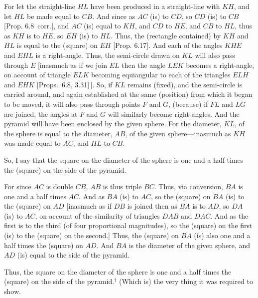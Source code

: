 \begin{Parallel}{}{}
{For let the straight-line $HL$ have been produced in a straight-line with $KH$, and let
$HL$ be made equal to $CB$. And since as $AC$ (is) to $CD$, 
so $CD$ (is) to $CB$ [Prop. 6.8~corr.], and $AC$ (is) equal to $KH$, and $CD$ to
$HE$, and $CB$ to $HL$, thus as $KH$ is to $HE$, so $EH$ (is) to $HL$.
Thus,  the (rectangle contained) by $KH$ and $HL$ is equal to the
(square) on $EH$ [Prop. 6.17]. And each of the angles $KHE$ and
$EHL$ is a right-angle. Thus, the semi-circle drawn on $KL$ 
will also pass through $E$ [inasmuch as if we join $EL$ then the angle
$LEK$ becomes a right-angle, on account of triangle $ELK$
becoming equiangular to each of the triangles $ELH$ and $EHK$ [Props.~6.8, 3.31]\,]. So, if
$KL$ remains (fixed), and the semi-circle is carried around, and again
established at the same (position) from which it began to be moved, 
it will also pass through points $F$ and $G$, (because) if  $FL$ and
$LG$ are joined, the angles at $F$ and $G$ will similarly become  right-angles. And the pyramid will have been enclosed by the given sphere.
For the diameter, $KL$,  of the sphere is equal to the diameter, $AB$,
of the given sphere---inasmuch as $KH$ was made equal to $AC$, 
and $HL$ to $CB$. 

So, I say that the square on the diameter of the sphere is
one and a half times the (square) on the side of the pyramid.

For since $AC$ is double $CB$, $AB$ is thus triple $BC$. Thus,
via conversion, $BA$ is one and a half times $AC$. And as
$BA$ (is) to $AC$, so the (square) on $BA$ (is) to the (square) on $AD$
[inasmuch as if $DB$ is joined then as $BA$ is to $AD$, so
$DA$ (is) to $AC$, on account of the similarity of triangles
$DAB$ and $DAC$. And as the first is to the third (of four
proportional magnitudes), so the (square) on the first (is) to the
(square) on the second.] Thus, the (square) on $BA$
(is) also one and a half times the (square) on $AD$. 
And $BA$ is the diameter of the given sphere, and $AD$
(is) equal to the side of the pyramid.

Thus, the square on the diameter of the sphere is one and a half
times the (square) on the side of the pyramid.$^\dag$ (Which is) the very thing
it was required to show.}
\end{Parallel}



